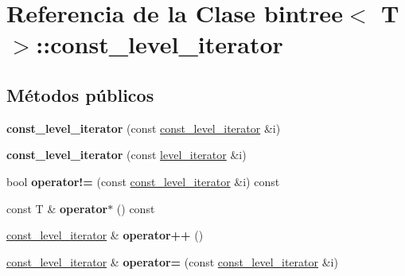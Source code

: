 \hypertarget{classbintree_1_1const__level__iterator}{}\section{Referencia de la Clase bintree$<$ T $>$\+:\+:const\+\_\+level\+\_\+iterator}
\label{classbintree_1_1const__level__iterator}
\subsection*{Métodos públicos}
\begin{DoxyCompactItemize}
\item 
\hypertarget{classbintree_1_1const__level__iterator_aa9ab98584ec8f8c5c84f85e6449b3237}{}{\bfseries const\+\_\+level\+\_\+iterator} (const \hyperlink{classbintree_1_1const__level__iterator}{const\+\_\+level\+\_\+iterator} \&i)\label{classbintree_1_1const__level__iterator_aa9ab98584ec8f8c5c84f85e6449b3237}

\item 
\hypertarget{classbintree_1_1const__level__iterator_a8454f1aa429dd89431ef4711ce50d1c9}{}{\bfseries const\+\_\+level\+\_\+iterator} (const \hyperlink{classbintree_1_1level__iterator}{level\+\_\+iterator} \&i)\label{classbintree_1_1const__level__iterator_a8454f1aa429dd89431ef4711ce50d1c9}

\item 
\hypertarget{classbintree_1_1const__level__iterator_a0d79bc90b834462af5747141eba37435}{}bool {\bfseries operator!=} (const \hyperlink{classbintree_1_1const__level__iterator}{const\+\_\+level\+\_\+iterator} \&i) const \label{classbintree_1_1const__level__iterator_a0d79bc90b834462af5747141eba37435}

\item 
\hypertarget{classbintree_1_1const__level__iterator_ac5aae2df8b0f420d3ad6d14f1c3e23b6}{}const T \& {\bfseries operator$\ast$} () const \label{classbintree_1_1const__level__iterator_ac5aae2df8b0f420d3ad6d14f1c3e23b6}

\item 
\hypertarget{classbintree_1_1const__level__iterator_a93e8545a61c8081e3b08307ac1d31c3a}{}\hyperlink{classbintree_1_1const__level__iterator}{const\+\_\+level\+\_\+iterator} \& {\bfseries operator++} ()\label{classbintree_1_1const__level__iterator_a93e8545a61c8081e3b08307ac1d31c3a}

\item 
\hypertarget{classbintree_1_1const__level__iterator_aeb952e9cda23245fe3127ecdace152a8}{}\hyperlink{classbintree_1_1const__level__iterator}{const\+\_\+level\+\_\+iterator} \& {\bfseries operator=} (const \hyperlink{classbintree_1_1const__level__iterator}{const\+\_\+level\+\_\+iterator} \&i)\label{classbintree_1_1const__level__iterator_aeb952e9cda23245fe3127ecdace152a8}


\end{DoxyCompactItemize}
